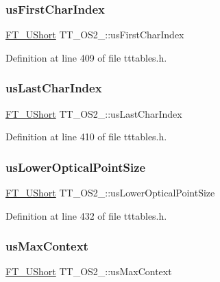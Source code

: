 \subsubsection{\texorpdfstring{usFirstCharIndex}{usFirstCharIndex}}
{\footnotesize\ttfamily \mbox{\hyperlink{fttypes_8h_a937f6c17cf5ffd09086d8610c37b9f58}{F\+T\+\_\+\+U\+Short}} T\+T\+\_\+\+O\+S2\+\_\+\+::us\+First\+Char\+Index}



Definition at line 409 of file tttables.\+h.

\mbox{\label{struct_t_t___o_s2___a2414af3de15c9eb24b73f06cceabe007}} 
\subsubsection{\texorpdfstring{usLastCharIndex}{usLastCharIndex}}
{\footnotesize\ttfamily \mbox{\hyperlink{fttypes_8h_a937f6c17cf5ffd09086d8610c37b9f58}{F\+T\+\_\+\+U\+Short}} T\+T\+\_\+\+O\+S2\+\_\+\+::us\+Last\+Char\+Index}



Definition at line 410 of file tttables.\+h.

\mbox{\label{struct_t_t___o_s2___a76193c4f0a29357bab8d8d70af10121a}} 
\subsubsection{\texorpdfstring{usLowerOpticalPointSize}{usLowerOpticalPointSize}}
{\footnotesize\ttfamily \mbox{\hyperlink{fttypes_8h_a937f6c17cf5ffd09086d8610c37b9f58}{F\+T\+\_\+\+U\+Short}} T\+T\+\_\+\+O\+S2\+\_\+\+::us\+Lower\+Optical\+Point\+Size}



Definition at line 432 of file tttables.\+h.

\mbox{\label{struct_t_t___o_s2___a167313e407c77db2c4ca5a987f3a1482}} 
\subsubsection{\texorpdfstring{usMaxContext}{usMaxContext}}
{\footnotesize\ttfamily \mbox{\hyperlink{fttypes_8h_a937f6c17cf5ffd09086d8610c37b9f58}{F\+T\+\_\+\+U\+Short}} T\+T\+\_\+\+O\+S2\+\_\+\+::us\+Max\+Context}




